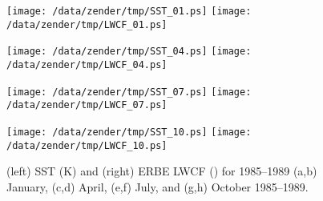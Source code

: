 \documentclass[twocolumn,final,11pt]{article}
\begin{document}
\begin{figure*}
\begin{center}
\texttt{[image: /data/zender/tmp/SST\_01.ps]}%
\texttt{[image: /data/zender/tmp/LWCF\_01.ps]}%

\texttt{[image: /data/zender/tmp/SST\_04.ps]}%
\texttt{[image: /data/zender/tmp/LWCF\_04.ps]}%

\texttt{[image: /data/zender/tmp/SST\_07.ps]}%
\texttt{[image: /data/zender/tmp/LWCF\_07.ps]}%

\texttt{[image: /data/zender/tmp/SST\_10.ps]}%
\texttt{[image: /data/zender/tmp/LWCF\_10.ps]}%
\end{center}
\caption[SST and ERBE LWCF for
1985--1989 January, April, July, and October]{
(left) SST (\degreee K) and (right) ERBE LWCF (\wxmS) for 1985--1989
(a,b) January, (c,d) April, (e,f) July, and (g,h) October 1985--1989. 
\label{fig:SST_dLWCF}}   
\end{figure*}

\end{document}
